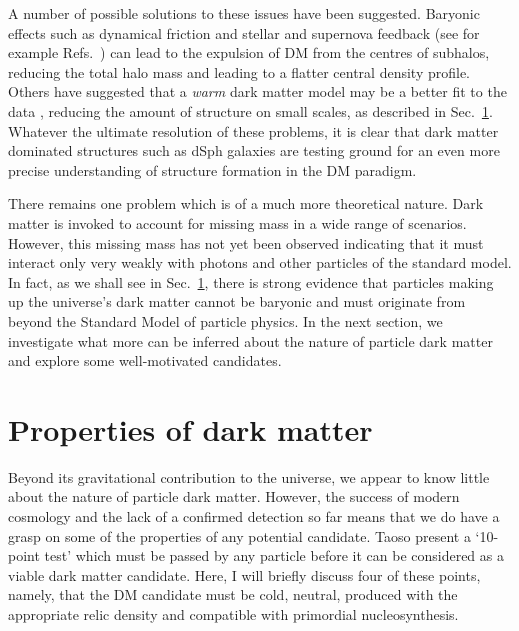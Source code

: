 A number of possible solutions to these issues have been suggested. Baryonic effects such as dynamical friction and stellar and supernova feedback (see for example Refs.~\cite{Gritschneder:2013, Amorisco:2014,DelPopolo:2014}) can lead to the expulsion of DM from the centres of subhalos, reducing the total halo mass and leading to a flatter central density profile.  Others have suggested that a \textit{warm} dark matter model may be a better fit to the data \cite{Moore:1999, Bode:2001, Maccio:2010}, reducing the amount of structure on small scales, as described in Sec.~\ref{intro:sec:properties}.  Whatever the ultimate resolution of these problems, it is clear that dark matter dominated structures such as dSph galaxies are testing ground for an even more precise understanding of structure formation in the DM paradigm.

There remains one problem which is of a much more theoretical nature. Dark matter is invoked to account for missing mass in a wide range of scenarios. However, this missing mass has not yet been observed indicating that it must interact only very weakly with photons and other particles of the standard model. In fact, as we shall see in Sec.~\ref{intro:sec:properties}, there is strong evidence that particles making up the universe's dark matter cannot be baryonic and must originate from beyond the Standard Model of particle physics. In the next section, we investigate what more can be inferred about the nature of particle dark matter and explore some well-motivated candidates.

\section{Properties of dark matter}
\label{intro:sec:properties}

Beyond its gravitational contribution to the universe, we appear to know little about the nature of particle dark matter. However, the success of modern cosmology and the lack of a confirmed detection so far means that we do have a grasp on some of the properties of any potential candidate. Taoso \etal \cite{Taoso:2008} present a `10-point test' which must be passed by any particle before it can be considered as a viable dark matter candidate. Here, I will briefly discuss four of these points, namely, that the DM candidate must be cold, neutral, produced with the appropriate relic density and compatible with primordial nucleosynthesis. 

